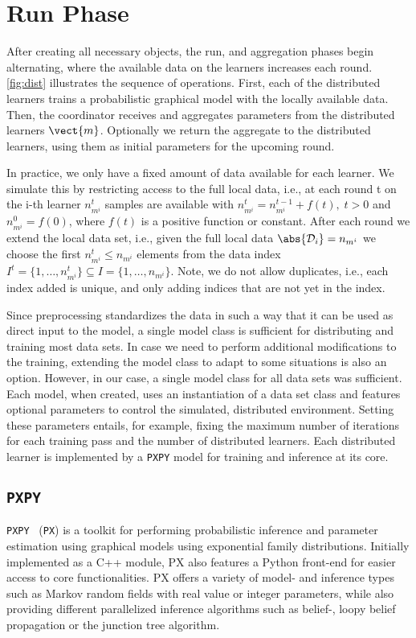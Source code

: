 \section{Run Phase}
After creating all necessary objects, the run, and aggregation phases begin alternating, where the available data on the learners increases each round.
\autoref{fig:dist} illustrates the sequence of operations.
First, each of the distributed learners trains a probabilistic graphical model with the locally available data.  
Then, the coordinator receives and aggregates parameters from the distributed learners $\vect{m}$. 
Optionally we return the aggregate to the distributed learners, using them as initial parameters for the upcoming round.

In practice, we only have a fixed amount of data available for each learner.
We simulate this by restricting access to the full local data, i.e., at each round t on the i-th learner  $n^{t}_{m^i}$ samples are available with $n^{t}_{m^i} = n^{t-1}_{m^i} + f(t), \; t > 0$ and $n^{0}_{m^i} = f(0)$, where $f(t)$ is a positive function or constant.
After each round we extend the local data set, i.e., given the full local data $\abs{\mathcal{D}_i} = n_{m^i}$  we choose the first  $ n^{t}_{m^i} \leq n_{m^i}$ elements from the data index $I^t =\{1, \ldots, n^{t}_{m^i}\} \subseteq I = \{1, \ldots, n_{m^i}\}$. 
Note, we do not allow duplicates, i.e., each index added is unique, and only adding indices that are not yet in the index.



Since preprocessing standardizes the data in such a way that it can be used as direct input to the model, a single model class is sufficient for distributing and training most data sets.
In case we need to perform additional modifications to the training, extending the model class to adapt to some situations is also an option.
However, in our case, a single model class for all data sets was sufficient.
Each model, when created, uses an instantiation of a data set class and features optional parameters to control the simulated, distributed environment. 
Setting these parameters entails, for example, fixing the maximum number of iterations for each training pass and the number of distributed learners.
Each distributed learner is implemented by a \texttt{PXPY} model for training and inference at its core.

\subsection{\texttt{PXPY}}
\texttt{PXPY}~\cite{piatkowski2018exponential} (\texttt{PX}) is a toolkit for performing probabilistic inference and parameter estimation using graphical models using exponential family distributions.
Initially implemented as a C++ module, PX also features a Python front-end for easier access to core functionalities.
PX offers a variety of model- and inference types such as Markov random fields with real value or integer parameters, while also providing different parallelized inference algorithms such as belief-, loopy belief propagation or the junction tree algorithm.

